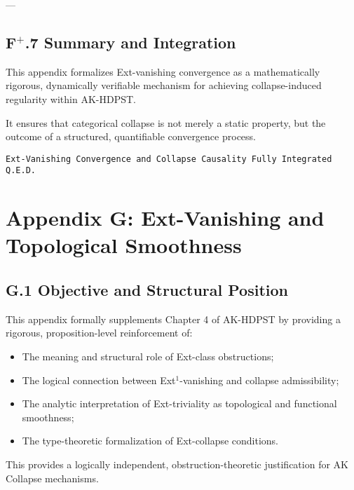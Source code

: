 \documentclass[11pt]{article}
\begin{document}
---

\subsection*{F$^{+}$.7 Summary and Integration}

This appendix formalizes Ext-vanishing convergence as a mathematically rigorous, dynamically verifiable mechanism for achieving collapse-induced regularity within AK-HDPST.

It ensures that categorical collapse is not merely a static property, but the outcome of a structured, quantifiable convergence process.

\begin{flushright}
\texttt{Ext-Vanishing Convergence and Collapse Causality \quad Fully Integrated \quad Q.E.D.}
\end{flushright}



\section*{Appendix G: Ext-Vanishing and Topological Smoothness}

\subsection*{G.1 Objective and Structural Position}

This appendix formally supplements Chapter 4 of AK-HDPST by providing a rigorous, proposition-level reinforcement of:

\begin{itemize}
    \item The meaning and structural role of Ext-class obstructions;
    \item The logical connection between Ext$^1$-vanishing and collapse admissibility;
    \item The analytic interpretation of Ext-triviality as topological and functional smoothness;
    \item The type-theoretic formalization of Ext-collapse conditions.
\end{itemize}

This provides a logically independent, obstruction-theoretic justification for AK Collapse mechanisms.
\end{document}
